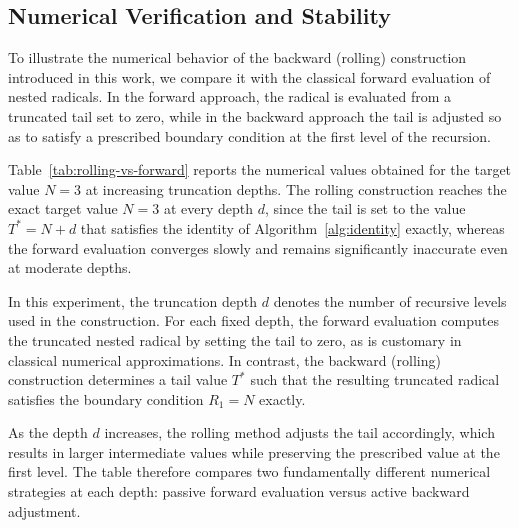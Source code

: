 \documentclass[11pt,a4paper]{amsart}
\theoremstyle{plain}
\theoremstyle{definition}
\theoremstyle{remark}
\begin{document}
\subsection{Numerical Verification and Stability}
\label{app:numerical-stability}
\mbox{} %

To illustrate the numerical behavior of the backward (rolling) construction introduced in this work, we compare it with the classical forward evaluation of nested radicals. In the forward approach, the radical is evaluated from a truncated tail set to zero, while in the backward approach the tail is adjusted so as to satisfy a prescribed boundary condition at the first level of the recursion.

Table~\ref{tab:rolling-vs-forward} reports the numerical values obtained for the target value $N=3$ at increasing truncation depths. The rolling construction reaches the exact target value $N=3$ at every depth $d$, since the tail is set to the value $T^\ast=N+d$ that satisfies the identity of Algorithm~\ref{alg:identity} exactly, whereas the forward evaluation converges slowly and remains significantly inaccurate even at moderate depths.

In this experiment, the truncation depth $d$ denotes the number of recursive levels used in the construction. For each fixed depth, the forward evaluation computes the truncated nested radical by setting the tail to zero, as is customary in classical numerical approximations. In contrast, the backward (rolling) construction determines a tail value $T^\ast$ such that the resulting truncated radical satisfies the boundary condition $R_1 = N$ exactly.

As the depth $d$ increases, the rolling method adjusts the tail accordingly, which results in larger intermediate values while preserving the prescribed value at the first level. The table therefore compares two fundamentally different numerical strategies at each depth: passive forward evaluation versus active backward adjustment.
\end{document}
